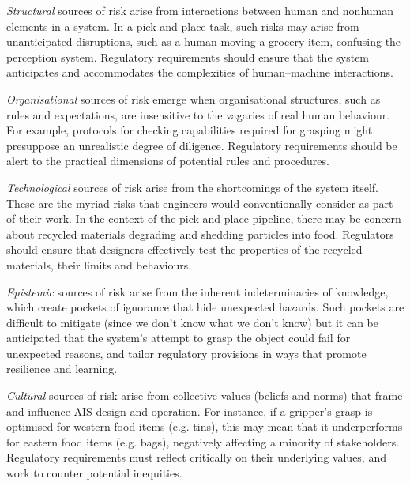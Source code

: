 \documentclass[lettersize,journal]{IEEEtran}
\begin{document}
\emph{Structural} sources of risk arise from interactions between human and nonhuman elements in a system.
In a pick-and-place task, such risks may arise from unanticipated disruptions, such as a human moving a grocery item, confusing the perception system. Regulatory requirements should ensure that the system anticipates and accommodates the complexities of human–machine interactions.

\emph{Organisational} sources of risk emerge when organisational structures, such as rules and expectations, are insensitive to the vagaries of real human behaviour. For example, protocols for checking capabilities required for grasping might presuppose an unrealistic degree of diligence. Regulatory requirements should be alert to the practical dimensions of potential rules and procedures.

\emph{Technological} sources of risk arise from the shortcomings of the system itself. These are the myriad risks that engineers would conventionally consider as part of their work. In the context of the pick-and-place pipeline, there may be  concern about recycled materials degrading and shedding particles into food. Regulators should ensure that designers effectively test the properties of the recycled materials, their limits and behaviours.

\emph{Epistemic} sources of risk arise from the inherent indeterminacies of knowledge, which create pockets of ignorance that hide unexpected hazards. Such pockets are difficult to mitigate (since we don’t know what we don’t know) but it can be anticipated that the system’s attempt to grasp the object could fail for unexpected reasons, and tailor regulatory provisions in ways that promote resilience and learning. 

\emph{Cultural} sources of risk arise from collective values (beliefs and norms) that frame and influence AIS design and operation. For instance, if a gripper’s grasp is optimised for western food items (e.g. tins), this may mean that it underperforms for eastern food items (e.g. bags), negatively affecting a minority of stakeholders. Regulatory requirements must reflect critically on their underlying values, and work to counter potential inequities. 
\end{document}
